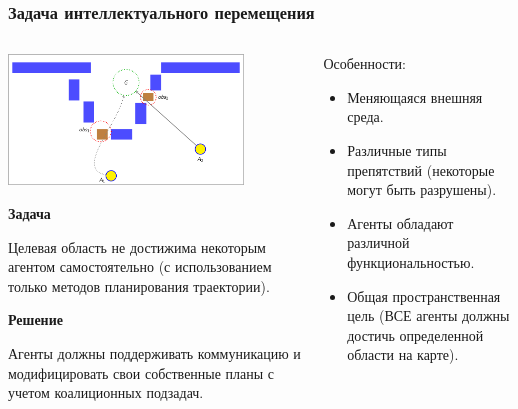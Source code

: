 \documentclass[default]{beamer}
\begin{document}
	\begin{frame}
		\frametitle{Задача интеллектуального перемещения}
		
		\begin{columns}
			\begin{column}{0.55\textwidth}
				\begin{center}
					\includegraphics[page=1,width=0.8\textwidth]{examples/slides_colored}
				\end{center}
				\vspace{-7pt}
				\small
				\textbf{Задача}
				
				Целевая область не достижима некоторым агентом самостоятельно (с использованием только методов планирования траектории).
				
				\textbf{Решение}
				
				Агенты должны поддерживать коммуникацию и модифицировать свои собственные планы с учетом коалиционных подзадач.
				
			\end{column}
			\begin{column}{0.45\textwidth}
				Особенности:
				\begin{itemize}
					\item Меняющаяся внешняя среда.
					\item Различные типы препятствий (некоторые могут быть разрушены).
					\item Агенты обладают различной функциональностью.
					\item Общая пространственная цель (ВСЕ агенты должны достичь определенной области на карте).
				\end{itemize}
			\end{column}
		\end{columns}
	\end{frame}
	
\end{document}
